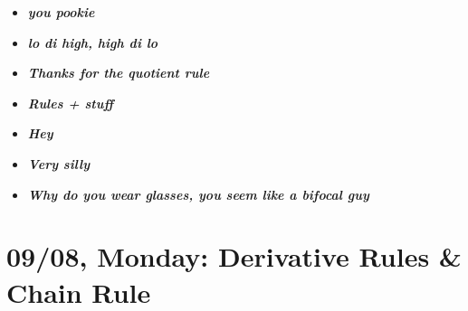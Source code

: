 \documentclass[11pt,letterpaper]{article}
\begin{document}
\begin{itemize}
\item {\bfseries\itshape you pookie}
\item {\bfseries\itshape lo di high, high di lo}
\item {\bfseries\itshape Thanks for the quotient rule}
\item {\bfseries\itshape Rules + stuff}
\item {\bfseries\itshape Hey}
\item {\bfseries\itshape Very silly}
\item {\bfseries\itshape Why do you wear glasses, you seem like a bifocal guy}
\end{itemize}

\newpage
\section*{09/08, Monday: Derivative Rules \& Chain Rule\label{09-08}}
\end{document}

